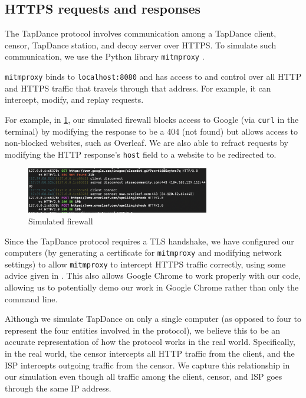 \documentclass[conference]{IEEEtran}
\begin{document}
\subsection{HTTPS requests and responses}

The TapDance protocol involves communication among a TapDance client, censor, TapDance station, and decoy server over HTTPS. To simulate such communication, we use the Python library \texttt{mitmproxy} \cite{mitmproxy}.

\texttt{mitmproxy} binds to \texttt{localhost:8080} and has access to and control over all HTTP and HTTPS traffic that travels through that address. For example, it can intercept, modify, and replay requests.

For example, in \ref{censor_sim}, our simulated firewall blocks access to Google (via \texttt{curl} in the terminal) by modifying the response to be a 404 (not found) but allows access to non-blocked websites, such as Overleaf. We are also able to refract requests by modifying the HTTP response's \texttt{host} field to a website to be redirected to.

\begin{figure}[htp]
    \centering
    \includegraphics[width=8cm]{img/censor_example.png}
    \caption{Simulated firewall}
    \label{censor_sim}
\end{figure}

Since the TapDance protocol requires a TLS handshake, we have configured our computers (by generating a certificate for \texttt{mitmproxy} and modifying network settings) to allow \texttt{mitmproxy} to intercept HTTPS traffic correctly, using some advice given in \cite{mitmproxy_firewall}. This also allows Google Chrome to work properly with our code, allowing us to potentially demo our work in Google Chrome rather than only the command line.

Although we simulate TapDance on only a single computer (as opposed to four to represent the four entities involved in the protocol), we believe this to be an accurate representation of how the protocol works in the real world. Specifically, in the real world, the censor intercepts all HTTP traffic from the client, and the ISP intercepts outgoing traffic from the censor. We capture this relationship in our simulation even though all traffic among the client, censor, and ISP goes through the same IP address.
\end{document}
